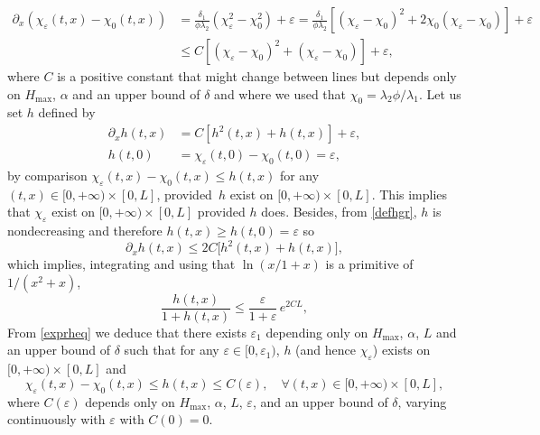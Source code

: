 \documentclass[11pt]{article}
\numberwithin{equation}{section}
\theoremstyle{definition}
\begin{document}
\begin{equation*}
\begin{split}
\partial_{x}(\chi_{\varepsilon}(t,x)-\chi_{0}(t,x)) &= \frac{\delta_{1}}{\phi\lambda_{2}}(\chi_{\varepsilon}^{2}-\chi_{0}^{2})+\varepsilon=\frac{\delta_{1}}{\phi\lambda_{2}}\left[(\chi_{\varepsilon}-\chi_{0})^{2}+2\chi_{0}(\chi_{\varepsilon}-\chi_{0})\right]+\varepsilon\\
&\leq C\left[(\chi_{\varepsilon}-\chi_{0})^{2}+(\chi_{\varepsilon}-\chi_{0})\right]+\varepsilon,
\end{split}
\end{equation*}
where $C$ is a positive constant that might change between lines but depends only on $H_{\max}$, $\alpha$ and an upper bound of $\delta$ and where we used that $\chi_{0} = \lambda_{2}\phi/\lambda_{1}$. Let us set $h$ defined by
\begin{equation}
\label{defhgr}
\begin{split}
\partial_{x}h(t,x) &= C\left[h^{2}(t,x)+h(t,x)\right]+\varepsilon,\\
h(t,0) &= \chi_{\varepsilon}(t,0)-\chi_{0}(t,0) = \varepsilon,
\end{split}
\end{equation}
{by comparison} $\chi_{\varepsilon}(t,x)-\chi_{0}(t,x)\leq h(t,x)$ for any $(t,x)\in[0,+\infty)\times [0,L]$, provided~$h$ exist on $[0,+\infty)\times [0,L]$. This implies that $\chi_{\varepsilon}$ exist on $[0,+\infty)\times [0,L]$ provided $h$ does. Besides, from \eqref{defhgr}, $h$ is nondecreasing and therefore $h(t,x)\geq h(t,0)=\varepsilon$ so
\begin{equation*}
\partial_{x}h(t,x) \leq 2C\bigl[h^{2}(t,x)+h(t,x)\bigr],
\end{equation*}
which implies, integrating and using that $\ln(x/1+x)$ is a primitive of $1/(x^{2}+x)$,
\begin{equation}
\label{exprheq}
\frac{h(t,x)}{1+h(t,x)}\leq \frac{\varepsilon}{1+\varepsilon}\,e^{2CL},
\end{equation}
From \eqref{exprheq}
we deduce that there exists
$\varepsilon_{1}$ depending only on $H_{\max}$, $\alpha$, $L$ and an upper bound of $\delta$ such that for any $\varepsilon\in[0,\varepsilon_{1})$, $h$ (and hence $\chi_{\varepsilon}$) exists on $[0,+\infty)\times[0,L]$ and
\begin{equation*}
\chi_{\varepsilon}(t,x)-\chi_{0}(t,x)\leq h(t,x)\leq C(\varepsilon),\quad\forall (t,x)\in[0,+\infty)\times[0,L],
\end{equation*}
where $C(\varepsilon)$ depends only on $H_{\max}$, $\alpha$, $L$, $\varepsilon$, and an upper bound of $\delta$, varying continuously with $\varepsilon$ with $C(0)=0$.
\end{document}
